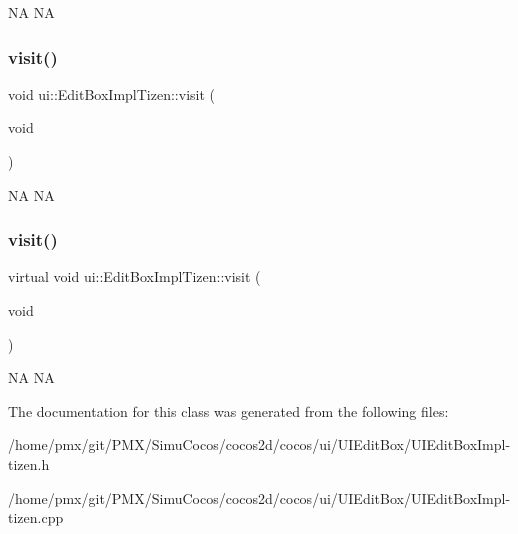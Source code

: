 NA  NA \mbox{\label{classui_1_1EditBoxImplTizen_ae873d765e0f7f369691dca2ef308be41}} 
\subsubsection{\texorpdfstring{visit()}{visit()}\hspace{0.1cm}{\footnotesize\ttfamily [1/2]}}
{\footnotesize\ttfamily void ui\+::\+Edit\+Box\+Impl\+Tizen\+::visit (\begin{DoxyParamCaption}\item[{void}]{ }\end{DoxyParamCaption})\hspace{0.3cm}{\ttfamily [virtual]}}

NA  NA \mbox{\label{classui_1_1EditBoxImplTizen_a2a1062fc2957039abdf3b36c379530de}} 
\subsubsection{\texorpdfstring{visit()}{visit()}\hspace{0.1cm}{\footnotesize\ttfamily [2/2]}}
{\footnotesize\ttfamily virtual void ui\+::\+Edit\+Box\+Impl\+Tizen\+::visit (\begin{DoxyParamCaption}\item[{void}]{ }\end{DoxyParamCaption})\hspace{0.3cm}{\ttfamily [virtual]}}

NA  NA 

The documentation for this class was generated from the following files\+:\begin{DoxyCompactItemize}
\item 
/home/pmx/git/\+P\+M\+X/\+Simu\+Cocos/cocos2d/cocos/ui/\+U\+I\+Edit\+Box/U\+I\+Edit\+Box\+Impl-\/tizen.\+h\item 
/home/pmx/git/\+P\+M\+X/\+Simu\+Cocos/cocos2d/cocos/ui/\+U\+I\+Edit\+Box/U\+I\+Edit\+Box\+Impl-\/tizen.\+cpp\end{DoxyCompactItemize}
